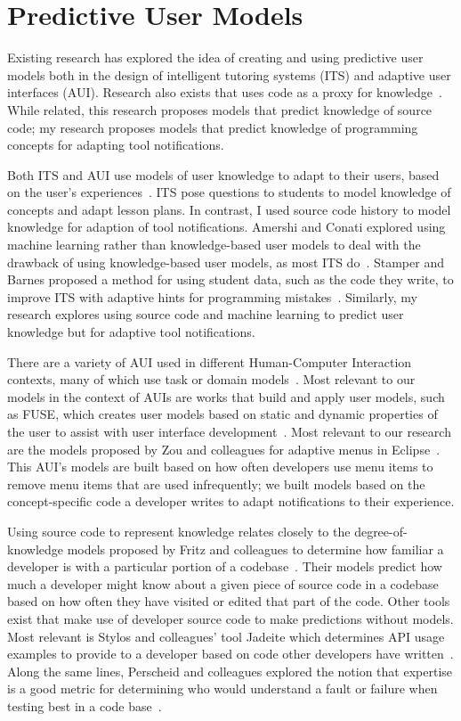 \section{Predictive User Models}
Existing research has explored the idea of creating and using predictive user models both in the design of intelligent tutoring systems (ITS) and adaptive user interfaces (AUI). Research also exists that uses code as a proxy for knowledge~\cite{fritz2010degree}. While related, this research proposes models that predict knowledge of source code; my research proposes models that predict knowledge of programming concepts for adapting tool notifications.

Both ITS and AUI use models of user knowledge to adapt to their users, based on the user's experiences~\cite{murray1999authoring}.
ITS pose questions to students to model knowledge of concepts and adapt lesson plans. In contrast, I used source code history to model knowledge for adaption of tool notifications.
Amershi and Conati explored using machine learning rather than knowledge-based user models to deal with the drawback of using knowledge-based user models, as most ITS do~\cite{amershi2007unsupervised}. 
Stamper and Barnes proposed a method for using student data, such as the code they write, to improve ITS with adaptive hints for programming mistakes~\cite{stamper2009unsupervised}.
Similarly, my research explores using source code and machine learning to predict user knowledge but for adaptive tool notifications.

There are a variety of AUI used in different Human-Computer Interaction contexts, many of which use task or domain models~\cite{schlungbaum1996model}. Most relevant to our models in the context of AUIs are works that build and apply user models, such as FUSE, which creates user models based on static and dynamic properties of the user to assist with user interface development~\cite{lonczewski1996fuse}. Most relevant to our research are the models proposed by Zou and colleagues for adaptive menus in Eclipse~\cite{zou2008adapting}.
This AUI's models are built based on how often developers use menu items to remove menu items that are used infrequently; we built models based on the concept-specific code a developer writes to adapt notifications to their experience.


Using source code to represent knowledge relates closely to the degree-of-knowledge models proposed by Fritz and colleagues to determine how familiar a developer is with a particular portion of a codebase~\cite{fritz2010degree}. Their models predict how much a developer might know about a given piece of source code in a codebase based on how often they have visited or edited that part of the code.
Other tools exist that make use of developer source code to make predictions without models. Most relevant is Stylos and colleagues' tool Jadeite which determines API usage examples to provide to a developer based on code other developers have written~\cite{stylos2009improving}.
Along the same lines, Perscheid and colleagues explored the notion that expertise is a good metric for determining who would understand a fault or failure when testing best in a code base~\cite{perscheid2012test}.

